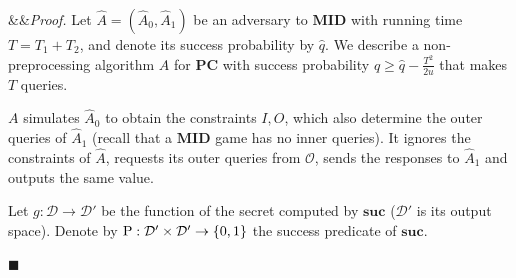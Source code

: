 \documentclass[11pt]{article}
\renewenvironment{proof}[1][]
    {\noindent
       \ifx&#1&{\it Proof.}
       \else{\it Proof ({#1}).}
       \fi}{\hfill $\blacksquare$}
\newcommand{\SECS}{{\mathcal{D}}}
\newcommand{\calO}{\mathcal{O}}
\newcommand{\SUC}{\boldsymbol{suc}}
\newcommand{\PC}{\boldsymbol{PC}}
\newcommand{\MID}{\boldsymbol{MID}}
\newcommand{\INP}{I}
\newcommand{\OUTP}{O}
\begin{document}
\begin{proof}
    Let $\widehat{A} = (\widehat{A}_0, \widehat{A}_1)$ be an adversary to $\MID$ with running time $T = T_1 + T_2$, and denote its success probability by $\widehat{q}$. We describe a non-preprocessing algorithm $A$ for $\PC$ with success probability $q \ge \widehat{q} - \frac{T^2}{2u}$ that makes $T$ queries.
     
     $A$ simulates $\widehat{A}_0$ to obtain the constraints $\INP,\OUTP$, which also determine the outer queries of $\widehat{A}_1$ (recall that a $\MID$ game has no inner queries). It ignores the constraints of $\widehat{A}$, requests its outer queries from $\calO$, sends the responses to $\widehat{A}_1$ and outputs the same value.


    Let $g: \SECS \to \SECS'$
    be the function of the secret computed by $\SUC$ ($\SECS'$ is its output space).
    Denote by $\textup{P}: \SECS' \times \SECS' \to \{0,1\}$ the success predicate of $\SUC$.


\end{proof}
\end{document}
